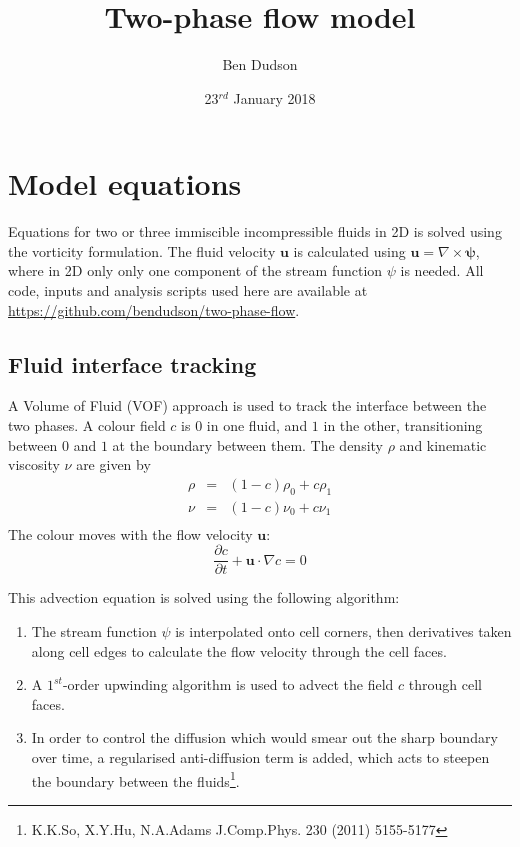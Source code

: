 \documentclass[12pt,a4paper]{article}
\title{ Two-phase flow model }%
\author{ Ben Dudson }%
\date{ 23$^{rd}$ January 2018 }%
\begin{document}
\maketitle %
\thispagestyle{fancy}%

\section{Model equations}

Equations for two or three immiscible incompressible fluids in 2D is
solved using the vorticity formulation. The fluid velocity
$\mathbf{u}$ is calculated using $\mathbf{u} =
\nabla\times\mathbf{\psi}$, where in 2D only only one component of the
stream function $\psi$ is needed. All code, inputs and analysis
scripts used here are available at
\url{https://github.com/bendudson/two-phase-flow}.

\subsection{Fluid interface tracking}

A Volume of Fluid (VOF) approach is used to track the interface
between the two phases. A colour field $c$ is $0$ in one fluid, and
$1$ in the other, transitioning between $0$ and $1$ at the boundary
between them. The density $\rho$ and kinematic viscosity $\nu$ are
given by
\begin{eqnarray}
\rho &=& \left(1-c\right)\rho_0 + c \rho_1 \\
\nu &=& \left(1-c\right)\nu_0 + c \nu_1 \\
\end{eqnarray}
The colour moves with the flow velocity $\mathbf{u}$:
\begin{equation}
\frac{\partial c}{\partial t} + \mathbf{u}\cdot\nabla c = 0
\end{equation}

This advection equation is solved using the following algorithm:
\begin{enumerate}
\item The stream function $\psi$ is interpolated onto cell corners, then derivatives taken along cell edges to calculate the flow
velocity through the cell faces.
\item A $1^{st}$-order upwinding algorithm is used to advect
  the field $c$ through cell faces.
\item In order to control the diffusion which would smear out
  the sharp boundary over time, a regularised anti-diffusion
  term is added, which acts to steepen the boundary between the
  fluids\footnote{K.K.So, X.Y.Hu, N.A.Adams J.Comp.Phys. 230 (2011) 5155-5177}. 
\end{enumerate}
\end{document}
